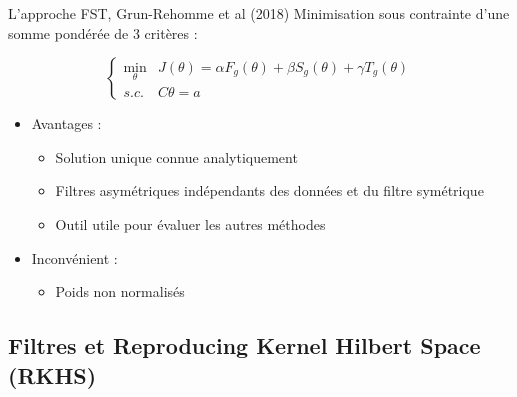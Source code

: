 \documentclass[10pt,xcolor=table,color={dvipsnames,usenames},ignorenonframetext,usepdftitle=false,french]{beamer}
\providecommand{\tightlist}{%
  \setlength{\parskip}{0pt}
  }
\newcommand\1{\mathds{1}}
\begin{document}
\begin{frame}{L'approche FST, Grun-Rehomme et al (2018)}
\protect\hypertarget{lapproche-fst-grun-rehomme-et-al-2018}{}
Minimisation sous contrainte d'une somme pondérée de 3 critères :

\[
\begin{cases}
\underset{\theta}{\min} & J(\theta)=
\alpha F_g(\theta)+\beta S_g(\theta)+\gamma T_g(\theta)\\
s.c. & C\theta=a
\end{cases}
\] \pause

\begin{summary}

\begin{itemize}
\item
  \bcsmbh Avantages :

  \begin{itemize}
  \item
    Solution unique connue analytiquement
  \item
    Filtres asymétriques indépendants des données et du filtre
    symétrique
  \item
    Outil utile pour évaluer les autres méthodes
  \end{itemize}
\item
  \bcsmmh Inconvénient :

  \begin{itemize}
  \tightlist
  \item
    Poids non normalisés
  \end{itemize}
\end{itemize}

\end{summary}
\end{frame}

\hypertarget{filtres-et-reproducing-kernel-hilbert-space-rkhs}{%
\subsection{Filtres et Reproducing Kernel Hilbert Space
(RKHS)}\label{filtres-et-reproducing-kernel-hilbert-space-rkhs}}
\end{document}
